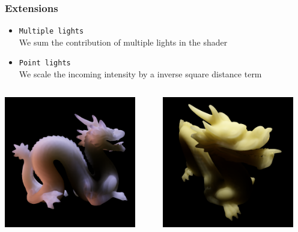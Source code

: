 \documentclass{beamer}
\begin{document}
\begin{frame}
    \frametitle{Extensions}
\begin{itemize}
\vspace{0.4cm}
	\item \texttt{Multiple lights} \\ We sum the contribution of multiple lights in the shader
	\item \texttt{Point lights} \\ We scale the incoming intensity by a inverse square distance term	
\end{itemize}
\begin{columns}
    \begin{column}{0.45\textwidth}
      \centering
		\includegraphics[width=0.9\textwidth]{multiple}
				\end{column}
   \begin{column}{0.45\textwidth}
      \centering
		\includegraphics[width=0.9\textwidth]{point}

\end{column}
\end{columns}
\end{frame}
\end{document}

